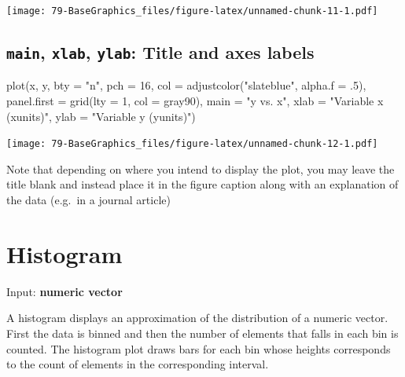 \documentclass[
]{book}
\newenvironment{Shaded}{\begin{snugshade}}{\end{snugshade}}
\newcommand{\AttributeTok}[1]{\textcolor[rgb]{0.77,0.63,0.00}{#1}}
\newcommand{\DecValTok}[1]{\textcolor[rgb]{0.00,0.00,0.81}{#1}}
\newcommand{\FunctionTok}[1]{\textcolor[rgb]{0.00,0.00,0.00}{#1}}
\newcommand{\NormalTok}[1]{#1}
\newcommand{\StringTok}[1]{\textcolor[rgb]{0.31,0.60,0.02}{#1}}
\begin{document}
\texttt{[image: 79-BaseGraphics\_files/figure-latex/unnamed-chunk-11-1.pdf]}

\hypertarget{main-xlab-ylab-title-and-axes-labels}{%
\subsection{\texorpdfstring{\textbf{\texttt{main}}, \textbf{\texttt{xlab}}, \textbf{\texttt{ylab}}: Title and axes labels}{main, xlab, ylab: Title and axes labels}}\label{main-xlab-ylab-title-and-axes-labels}}

\begin{Shaded}
\begin{Highlighting}[]
\FunctionTok{plot}\NormalTok{(x, y,}
     \AttributeTok{bty =} \StringTok{"n"}\NormalTok{, }\AttributeTok{pch =} \DecValTok{16}\NormalTok{,}
     \AttributeTok{col =} \FunctionTok{adjustcolor}\NormalTok{(}\StringTok{"slateblue"}\NormalTok{, }\AttributeTok{alpha.f =}\NormalTok{ .}\DecValTok{5}\NormalTok{),}
     \AttributeTok{panel.first =} \FunctionTok{grid}\NormalTok{(}\AttributeTok{lty =} \DecValTok{1}\NormalTok{, }\AttributeTok{col =} \StringTok{\textquotesingle{}gray90\textquotesingle{}}\NormalTok{),}
     \AttributeTok{main =} \StringTok{"y vs. x"}\NormalTok{,}
     \AttributeTok{xlab =} \StringTok{"Variable x (xunits)"}\NormalTok{,}
     \AttributeTok{ylab =} \StringTok{"Variable y (yunits)"}\NormalTok{)}
\end{Highlighting}
\end{Shaded}

\texttt{[image: 79-BaseGraphics\_files/figure-latex/unnamed-chunk-12-1.pdf]}

Note that depending on where you intend to display the plot, you may leave the title blank and instead place it in the figure caption along with an explanation of the data (e.g.~in a journal article)

\hypertarget{histogram}{%
\section{Histogram}\label{histogram}}

Input: \textbf{numeric vector}

A histogram displays an approximation of the distribution of a numeric vector. First the data is binned and then the number of elements that falls in each bin is counted. The histogram plot draws bars for each bin whose heights corresponds to the count of elements in the corresponding interval.
\end{document}
